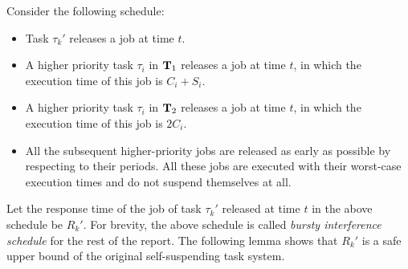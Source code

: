 Consider the following schedule:
\begin{itemize}
\item Task $\tau_k'$ releases a job at time $t$.
\item A higher priority task $\tau_i$ in ${\bf T}_1$ releases a job at time $t$, in which the execution time of this job is $C_i+S_i$.
\item A higher priority task $\tau_i$ in ${\bf T}_2$ releases a job at time $t$, in which the execution time of this job is $2C_i$.
\item All the subsequent higher-priority jobs are released as early as possible by respecting to their periods. All these jobs are executed with their worst-case execution times and do not suspend themselves at all.
\end{itemize}

Let the response time of the job of task $\tau_k'$ released at time $t$ in the above schedule be $R_k'$. For brevity, the above schedule is called \emph{bursty interference schedule} for the rest of the report. The following lemma shows that $R_k'$ is a safe upper bound of the original self-suspending task system. 

